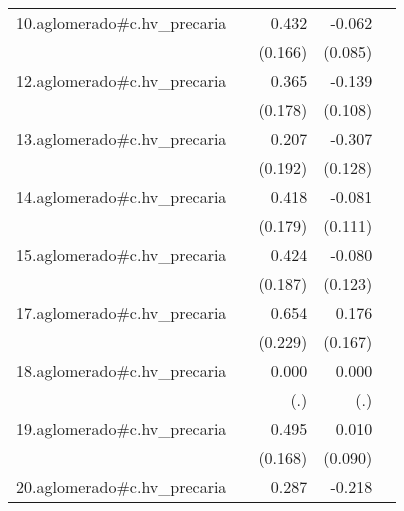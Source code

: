 {\begin{longtable}{l*{4}{D{.}{.}{-1}}}
\addlinespace
10.aglomerado#c.hv\_precaria&                     &       0.432\sym{**} &      -0.062         &                     \\
            &                     &     (0.166)         &     (0.085)         &                     \\
\addlinespace
12.aglomerado#c.hv\_precaria&                     &       0.365\sym{*}  &      -0.139         &                     \\
            &                     &     (0.178)         &     (0.108)         &                     \\
\addlinespace
13.aglomerado#c.hv\_precaria&                     &       0.207         &      -0.307\sym{*}  &                     \\
            &                     &     (0.192)         &     (0.128)         &                     \\
\addlinespace
14.aglomerado#c.hv\_precaria&                     &       0.418\sym{*}  &      -0.081         &                     \\
            &                     &     (0.179)         &     (0.111)         &                     \\
\addlinespace
15.aglomerado#c.hv\_precaria&                     &       0.424\sym{*}  &      -0.080         &                     \\
            &                     &     (0.187)         &     (0.123)         &                     \\
\addlinespace
17.aglomerado#c.hv\_precaria&                     &       0.654\sym{**} &       0.176         &                     \\
            &                     &     (0.229)         &     (0.167)         &                     \\
\addlinespace
18.aglomerado#c.hv\_precaria&                     &       0.000         &       0.000         &                     \\
            &                     &         (.)         &         (.)         &                     \\
\addlinespace
19.aglomerado#c.hv\_precaria&                     &       0.495\sym{**} &       0.010         &                     \\
            &                     &     (0.168)         &     (0.090)         &                     \\
\addlinespace
20.aglomerado#c.hv\_precaria&                     &       0.287         &      -0.218         &                     \\

\end{longtable}}

